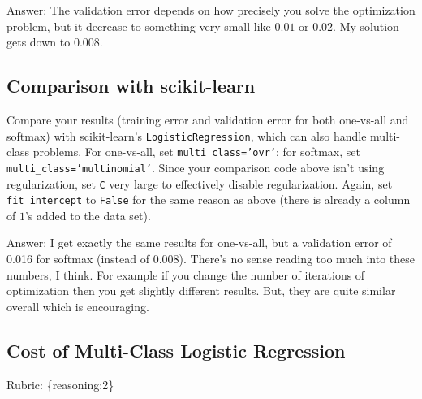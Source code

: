 \documentclass{article}
\def\ans#1{\par\gre{Answer: #1}}
\def\answer#1{\ans{#1}}
\def\rubric#1{\gre{Rubric: \{#1\}}}{}
\def\blu#1{{\color{blu}#1}}
\def\gre#1{{\color{gre}#1}}
\begin{document}
\answer{
The validation error depends on how precisely you solve the optimization problem,
but it decrease to something very small like $0.01$ or $0.02$. My solution gets down to $0.008$.
}

\subsection{Comparison with scikit-learn}
\blu{
Compare your results (training error and validation error for both one-vs-all and softmax) with scikit-learn's \texttt{LogisticRegression},
which can also handle multi-class problems.
For one-vs-all, set \texttt{multi\string_class='ovr'}; for softmax, set \texttt{multi\string_class='multinomial'}. 
Since your comparison code above isn't using regularization, set \texttt{C} very large to effectively disable regularization.
Again, set \texttt{fit\string_intercept} to \texttt{False} for the same reason as above (there is already a column of $1$'s added to the data set).
}
\answer{
I get exactly the same results for one-vs-all, but a validation error of 0.016 for softmax (instead of 0.008). There's
no sense reading too much into these numbers, I think. For example if you change the number of iterations of optimization
then you get slightly different results. But, they are quite similar overall which is encouraging.
}

\subsection{Cost of Multi-Class Logistic Regression}
\rubric{reasoning:2}
\end{document}
